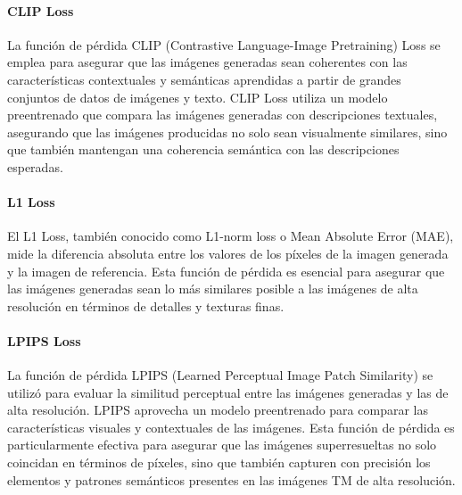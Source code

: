                     \paragraph{CLIP Loss}
                        La función de pérdida CLIP (Contrastive Language-Image Pretraining) Loss se emplea para asegurar que las imágenes generadas sean coherentes con las características contextuales y semánticas aprendidas a partir de grandes conjuntos de datos de imágenes y texto. CLIP Loss utiliza un modelo preentrenado que compara las imágenes generadas con descripciones textuales, asegurando que las imágenes producidas no solo sean visualmente similares, sino que también mantengan una coherencia semántica con las descripciones esperadas.

                    \paragraph{L1 Loss}
                        El L1 Loss, también conocido como L1-norm loss o Mean Absolute Error (MAE), mide la diferencia absoluta entre los valores de los píxeles de la imagen generada y la imagen de referencia. Esta función de pérdida es esencial para asegurar que las imágenes generadas sean lo más similares posible a las imágenes de alta resolución en términos de detalles y texturas finas.

                    \paragraph{LPIPS Loss}
                        La función de pérdida LPIPS (Learned Perceptual Image Patch Similarity) se utilizó para evaluar la similitud perceptual entre las imágenes generadas y las de alta resolución. LPIPS aprovecha un modelo preentrenado para comparar las características visuales y contextuales de las imágenes. Esta función de pérdida es particularmente efectiva para asegurar que las imágenes superresueltas no solo coincidan en términos de píxeles, sino que también capturen con precisión los elementos y patrones semánticos presentes en las imágenes TM de alta resolución.

